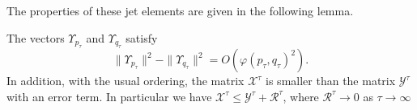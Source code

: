 \documentclass[reqno]{amsart}
\newcommand{\spn}{\operatorname{span}}
\newcommand{\ip}[2]{\ensuremath{\langle #1 , #2 \rangle}}
\begin{document}
The properties of these jet elements are given in the following lemma. 
\begin{lemma}\label{5.2}
The vectors $\Upsilon_{p_\tau}$ and $\Upsilon_{q_\tau}$ satisfy
\begin{equation}\|\Upsilon_{p_\tau}\|^2-\|\Upsilon_{q_\tau}\|^2=O(\varphi(p_\tau,q_\tau)^2).\end{equation}
In addition, with the usual ordering, the matrix $\mathcal{X}^\tau$ is smaller than the matrix $\mathcal{Y}^\tau$ with an error term. In particular we have $\mathcal{X}^\tau\leq\mathcal{Y}^\tau+\mathcal{R}^\tau$, where $\mathcal{R}^\tau\rightarrow0$ as $\tau\rightarrow\infty$
\end{lemma}
\end{document}
